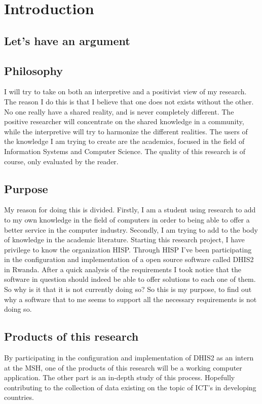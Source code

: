 \chapter{Introduction}
\section{Let's have an argument}

\section{Philosophy}
I will try to take on both an interpretive and a positivist view of my research.
The reason I do this is that I believe that one does not exists without the other.
No one really have a shared reality, and is never completely different.
The positive researcher will concentrate on the shared knowledge in a community, while the interpretive will try to harmonize the different realities. The users of the knowledge I am trying to create are the academics, focused in the field of Information Systems and Computer Science. The quality of this research is of course, only evaluated by the reader.

\section{Purpose}
My reason for doing this is divided. 
Firstly, I am a student using research to add to my own knowledge in the field of computers in order to being able to offer a better service in the computer industry.
Secondly, I am trying to add to the body of knowledge in the academic literature.
Starting this research project, I have privilege to know the organization HISP. 
Through HISP I've been participating in the configuration and implementation of a open source software called DHIS2 in Rwanda. After a quick analysis of the requirements I took notice that the software in question should indeed be able to offer solutions to each one of them. So why is it that it is not currently doing so? 
So this is my purpose, to find out why a software that to me seems to support all the necessary requirements is not doing so.

\section{Products of this research}
By participating in the configuration and implementation of DHIS2 as an intern at the MSH, one of the products of this research will be a working computer application. The other part is an in-depth study of this process. Hopefully contributing to the collection of data existing on the topic of ICT's in developing countries.


